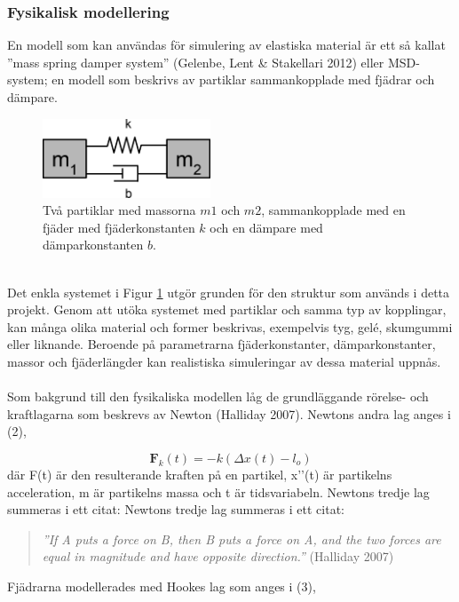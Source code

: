 \documentclass[a4paper,12pt,oneside,final,swedish]{extarticle}
\begin{document}
\subsubsection{Fysikalisk modellering}
En modell som kan användas för simulering av elastiska material är ett så kallat ''mass spring damper system'' (Gelenbe, Lent \& Stakellari 2012) eller MSD-system; en modell som beskrivs av partiklar sammankopplade med fjädrar och dämpare.\\
\begin{figure}[h!]
  \begin{center}
    \includegraphics[width=5cm]{Bilder/simple1D.png} 
  \end{center}
  \caption{Två partiklar med massorna $m1$ och $m2$, sammankopplade med en fjäder med fjäderkonstanten $k$ och en dämpare med dämparkonstanten $b$.}
  \label{m1m2::nonfloat}
\end{figure}
\\Det enkla systemet i Figur \ref{m1m2::nonfloat} utgör grunden för den struktur som används i detta projekt. Genom att utöka systemet med partiklar och samma typ av kopplingar, kan många olika material och former beskrivas, exempelvis tyg, gelé, skumgummi eller liknande. Beroende på parametrarna fjäderkonstanter, dämparkonstanter, massor och fjäderlängder kan realistiska simuleringar av dessa material uppnås.
\\\\Som bakgrund till den fysikaliska modellen låg de grundläggande rörelse- och kraftlagarna som beskrevs av Newton (Halliday 2007). Newtons andra lag anges i (2),

\begin{equation}
	{ \mathbf F }_{ k }(t)=-k(\Delta x(t)-{ l }_{ o })
\end{equation}
där F(t) är den resulterande kraften på en partikel, x’’(t) är partikelns acceleration, m är partikelns massa och t är tidsvariabeln. Newtons tredje lag summeras i ett citat:
Newtons tredje lag summeras i ett citat:
\begin{quote}\begin{center}\textit{''If A puts a force on B, then B puts a force on A, and the two forces are equal in magnitude and have opposite direction.''} (Halliday 2007)\end{center}\end{quote}
Fjädrarna modellerades med Hookes lag som anges i (3),
\end{document}
